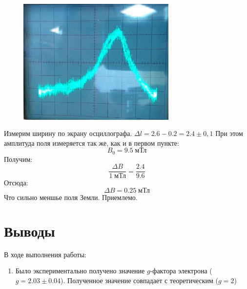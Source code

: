 \documentclass{article}
\begin{document}
\begin{figure}[H]
	\centering
	\includegraphics[width=0.7\textwidth]{Osc.jpeg}
\end{figure}

Измерим ширину по экрану осциллографа. \(\Delta l = 2.6 - 0.2 = 2.4 \pm 0,1\)
При этом амплитуда поля измеряется так же, как и в первом пункте: 
\[B_0 = 9.5\; \text{мТл}\]
Получим:
\[ \frac{\Delta B}{1\;\text{мТл}} = \frac{2.4}{9.6} \]
Отсюда:
\[\Delta B = 0.25\;\text{мТл}\]
Что сильно меншье поля Земли. Приемлемо.
\section{Выводы}
В ходе выполнения работы:
\begin{enumerate}
	\item Было экспериментально получено значение \(g\)-фактора электрона (\(g = 2.03 \pm 0.04\)). Полученное значение совпадает с теоретическим (\(g = 2\))
\end{enumerate}
\end{document}
